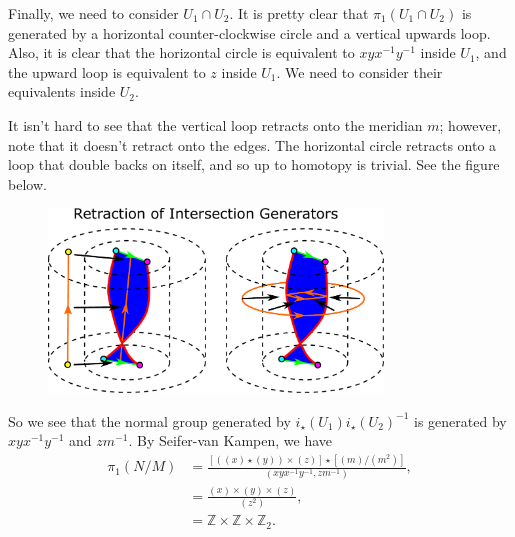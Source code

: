 Finally, we need to consider \(U_1 \cap U_2\). It is pretty clear that \(\pi_1(U_1 \cap U_2)\) is generated by
a horizontal counter-clockwise circle and a vertical upwards loop. Also, it is clear that the horizontal 
circle is equivalent to \(xyx^{-1}y^{-1}\) inside \(U_1\), and the upward loop is equivalent to \(z\) inside
\(U_1\). We need to consider their equivalents inside \(U_2\). 

It isn't hard to see that the vertical loop retracts onto the meridian \(m\); however, note that it doesn't
retract onto the edges. The horizontal circle retracts onto a loop that double backs on itself, and so up to
homotopy is trivial. See the figure below. 

\begin{figure}[H]
\centering
\includegraphics[width = 3.5in]{Topology/FundamentalGroupQuotient/intersection.pdf}
\end{figure}

So we see that the normal group generated by \(i_\star(U_1) i_\star(U_2)^{-1}\) is generated by
\(xyx^{-1}y^{-1}\) and \(zm^{-1}\). By Seifer-van Kampen, we have
\begin{align}
\pi_1(N / M) & = \frac{ [((x)\star (y))\times (z)] \star [(m) / (m^2)]} {(xyx^{-1}y^{-1}, zm^{-1}) }, \\
    & = \frac{(x)\times(y)\times(z)}{(z^2)}, \\
    & = \mathbb Z \times \mathbb Z \times \mathbb Z_2. 
\end{align}
